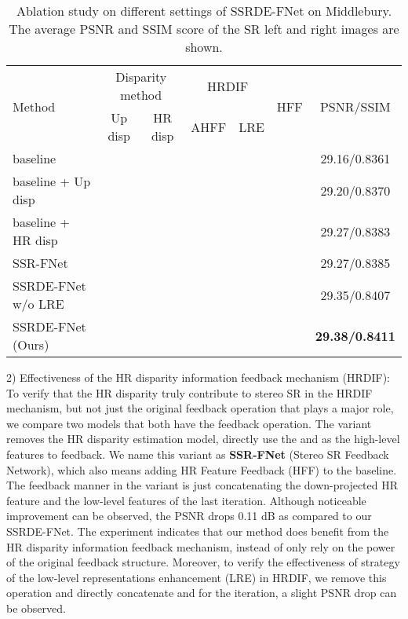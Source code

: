 \documentclass[sigconf]{acmart}
\begin{document}
\begin{table}
\caption{Ablation study on different settings of SSRDE-FNet on Middlebury. The average PSNR and SSIM score of the SR left and right images are shown.}
\label{component}
\renewcommand\arraystretch{0.9}
\vspace{-10pt}
    \small
    \setlength{\tabcolsep}{0.7mm}
	\centering
	\begin{tabular}{lcccccc}
	    \toprule
	   \multirow{2}{*}{Method} & \multicolumn{2}{c}{Disparity method} & \multicolumn{2}{c}{HRDIF} & \multirow{2}{*}{HFF} & \multirow{2}{*}{PSNR/SSIM}\\
	   \cmidrule(lr){2-3} \cmidrule(lr){4-5}
		& {Up disp} & {HR disp} & AHFF & LRE & &  \\
		\midrule
		 baseline &  &  &  & & & 29.16/0.8361 \\
		 baseline + Up disp &  & & & &  & 29.20/0.8370 \\
		 baseline + HR disp & & & & & & 29.27/0.8383 \\
		 SSR-FNet &  & & & &  & 29.27/0.8385 \\
		 SSRDE-FNet w/o LRE &  &  &  & & & 29.35/0.8407 \\
		 SSRDE-FNet (Ours) &  &  &  &  & & \textbf{29.38/0.8411} \\
		\bottomrule
	\end{tabular}
\vspace{-8px}
\end{table}



2) Effectiveness of the HR disparity information feedback mechanism (HRDIF): To verify that the HR disparity truly contribute to stereo SR in the HRDIF mechanism, but not just the original feedback operation that plays a major role, we compare two models that both have the feedback operation. The variant removes the HR disparity estimation model, directly use the  and  as the high-level features to feedback. We name this variant as \textbf{SSR-FNet} (Stereo SR Feedback Network), which also means adding HR Feature Feedback (HFF) to the baseline.  The feedback manner in the variant is just concatenating the down-projected HR feature and the low-level features of the last iteration. Although noticeable improvement can be observed, the PSNR drops 0.11 dB as compared to our SSRDE-FNet. The experiment indicates that our method does benefit from the HR disparity information feedback mechanism, instead of only rely on the power of the original feedback structure. Moreover, to verify the effectiveness of strategy of the low-level representations enhancement (LRE) in HRDIF, we remove this operation and directly concatenate  and  for the  iteration, a slight PSNR drop can be observed.
\end{document}

